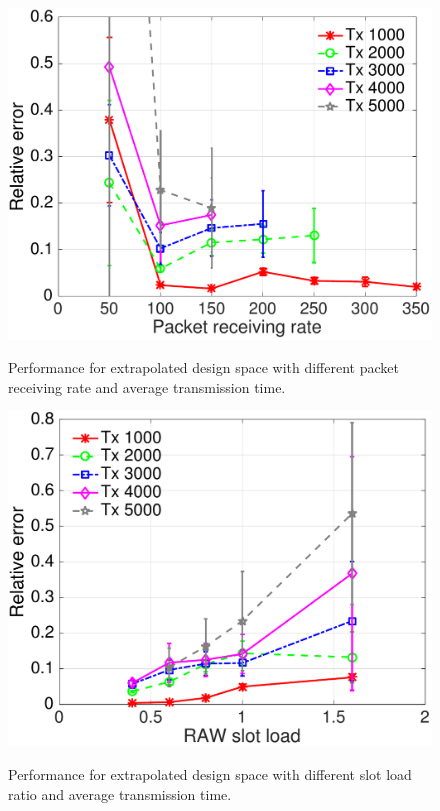 
 \begin{figure}[t]
    \centering
{\includegraphics[width=0.8\columnwidth]{figures/tx_result_load_all_yxlim}}
  \caption{Performance for extrapolated design space with different packet receiving rate and average transmission time. \label{fig:results-extended-prate}}
\end{figure}


 \begin{figure}[t]
    \centering
{\includegraphics[width=0.8\columnwidth]{figures/1_50_error_fliter}}
  \caption{Performance for extrapolated design space with different slot load ratio and average transmission time. \label{fig:results-extended-load}}
\end{figure}


